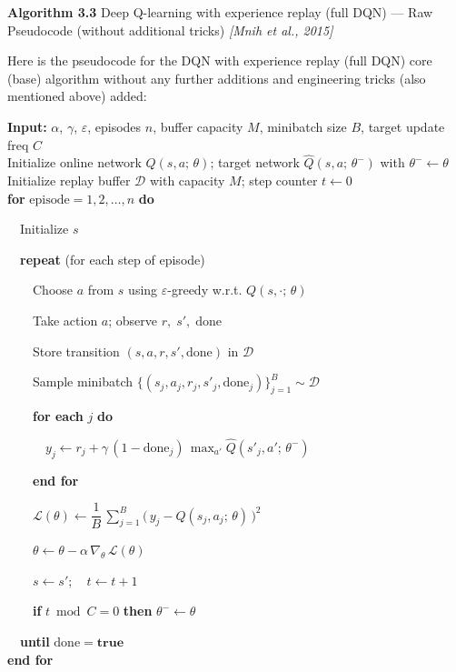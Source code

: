 \documentclass[11pt]{article}
\begin{document}
    \begin{pseudobox}

\textbf{Algorithm 3.3} Deep Q-learning with experience replay (full DQN)
--- Raw Pseudocode (without additional tricks) \emph{{[}Mnih et al.,
2015{]}}

\tcbline

Here is the pseudocode for the DQN with experience replay (full DQN)
core (base) algorithm without any further additions and engineering
tricks (also mentioned above) added:

\textbf{Input:} \(\alpha\), \(\gamma\), \(\varepsilon\), episodes \(n\),
buffer capacity \(M\), minibatch size \(B\), target update freq \(C\)\\
Initialize online network \(Q(s, a;\, \theta)\); target network
\(\hat{Q}(s, a;\, \theta^{-})\) with \(\theta^{-} \leftarrow \theta\)\\
Initialize replay buffer \(\mathcal{D}\) with capacity \(M\); step
counter \(t \leftarrow 0\)\\
\textbf{for} \(\text{episode} = 1, 2, \ldots, n\) \textbf{do}\\
\strut ~~Initialize \(s\)\\
\strut ~~\textbf{repeat} (for each step of episode)\\
\strut ~~~~Choose \(a\) from \(s\) using \(\varepsilon\)-greedy w.r.t.
\(Q(s, \cdot;\, \theta)\)\\
\strut ~~~~Take action \(a\); observe \(r,\; s',\; \text{done}\)\\
\strut ~~~~Store transition \((s, a, r, s', \text{done})\) in
\(\mathcal{D}\)\\
\strut ~~~~Sample minibatch
\(\{(s_j, a_j, r_j, s'_j, \text{done}_j)\}_{j=1}^{B} \sim \mathcal{D}\)\\
\strut ~~~~\textbf{for each} \(j\) \textbf{do}\\
\strut ~~~~~~\(y_j \leftarrow r_j + \gamma\,(1 - \text{done}_j)\, \max_{a'} \hat{Q}(s'_j, a';\, \theta^{-})\)\\
\strut ~~~~\textbf{end for}\\
\strut ~~~~\(\mathcal{L}(\theta) \leftarrow \dfrac{1}{B}\, \sum_{j=1}^{B} \bigl(\, y_j - Q(s_j, a_j;\, \theta) \,\bigr)^{2}\)\\
\strut ~~~~\(\theta \leftarrow \theta - \alpha\, \nabla_{\theta}\, \mathcal{L}(\theta)\)\\
\strut ~~~~\(s \leftarrow s';\quad t \leftarrow t + 1\)\\
\strut ~~~~\textbf{if} \(t \bmod C = 0\) \textbf{then}
\(\theta^{-} \leftarrow \theta\)\\
\strut ~~\textbf{until} \(\text{done} = \mathbf{true}\)\\
\textbf{end for}

\end{pseudobox}
\end{document}
